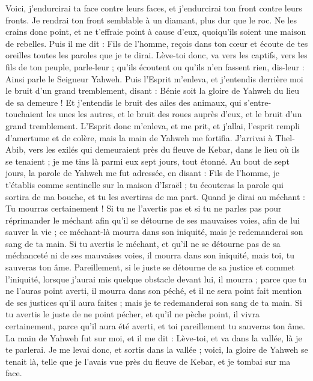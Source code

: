 \begin{multicols}{2}
Voici, j’endurcirai ta face contre leurs faces, et j’endurcirai ton front contre leurs fronts.
Je rendrai ton front semblable à un diamant, plus dur que le roc. Ne les crains donc point, et ne t'effraie point à cause d'eux, quoiqu'ils soient une maison de rebelles.
Puis il me dit : Fils de l’homme, reçois dans ton cœur et écoute de tes oreilles toutes les paroles que je te dirai.
Lève-toi donc, va vers les captifs, vers les fils de ton peuple, parle-leur ;  qu'ils écoutent ou qu'ils n'en fassent rien, dis-leur : Ainsi parle le Seigneur Yahweh.
Puis l'Esprit m'enleva, et j'entendis derrière moi le bruit d’un grand tremblement, disant : Bénie soit la gloire de Yahweh du lieu de sa demeure !
Et j'entendis le bruit des ailes des animaux, qui s'entre-touchaient les unes les autres, et le bruit des roues auprès d'eux, et le bruit d’un grand tremblement.
L'Esprit donc m'enleva, et me prit, et j’allai, l'esprit rempli d'amertume et de colère, mais la main de Yahweh me fortifia.
J’arrivai à Thel-Abib, vers les exilés qui demeuraient près du fleuve de Kebar, dans le lieu où ils se tenaient ; je me tins là parmi eux sept jours, tout étonné.
Au bout de sept jours, la parole de Yahweh me fut adressée, en disant :
Fils de l’homme, je t’établis comme sentinelle sur la maison d'Israël ; tu écouteras la parole qui sortira de ma bouche, et tu les avertiras de ma part.
Quand je dirai au méchant : Tu mourras certainement ! Si tu ne l’avertis pas et si tu ne parles pas pour réprimander le méchant afin qu’il se détourne de ses mauvaises voies, afin de lui sauver la vie ; ce méchant-là mourra dans son iniquité, mais je redemanderai son sang de ta main.
Si tu avertis le méchant, et qu'il ne se détourne pas de sa méchanceté ni de ses mauvaises voies, il mourra dans son iniquité, mais toi, tu sauveras ton âme.
Pareillement, si le juste se détourne de sa justice et commet l'iniquité, lorsque j'aurai mis quelque obstacle devant lui, il mourra ; parce que tu ne l'auras point averti, il mourra dans son péché, et il ne sera point fait mention de ses justices qu'il aura faites ; mais je te redemanderai son sang de ta main.
Si tu avertis le juste de ne point pécher, et qu’il ne pèche point, il vivra certainement, parce qu'il aura été averti, et toi pareillement tu sauveras ton âme.
La main de Yahweh fut sur moi, et il me dit : Lève-toi, et va dans la vallée, là je te parlerai.
Je me levai donc, et sortis dans la vallée ; voici, la gloire de Yahweh se tenait là, telle que je l’avais vue près du fleuve de Kebar, et je tombai sur ma face.

\end{multicols}
